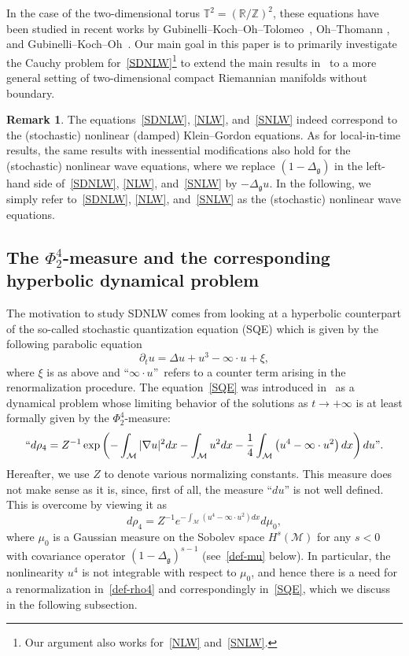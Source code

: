 \documentclass[10pt]{amsart}
\theoremstyle{definition}\newtheorem{defi}[theo]{Definition}\newtheorem{rema}[theo]{Remark}\newtheorem{exam}[theo]{Example}\newtheorem{exem}[theo]{Example}\newtheorem{nota}[theo]{Notation}
\newcommand{\Z}{\mathbb{Z}}
\newcommand{\R}{\mathbb{R}}
\newcommand{\T}{\mathbb{T}}
\newcommand{\M}{\mathcal{M}}
\newcommand{\g}{\mathfrak{g}}
\newcommand{\Dlg}{\Delta_{\g}}
\newcommand{\Dl}{\Delta}
\newcommand{\dt}{\partial_t}
\begin{document}
In the case of the two-dimensional torus $\T^2 = (\R/\Z)^2$, these equations have been studied in recent works by Gubinelli--Koch--Oh--Tolomeo~\cite{GKOT}, Oh--Thomann \cite{OT2}, and Gubinelli--Koch--Oh~\cite{GKO}. Our main goal in this paper is to primarily investigate the Cauchy problem for~\eqref{SDNLW}\footnote{Our argument also works for~\eqref{NLW} and~\eqref{SNLW}.} to extend the main results in~\cite{GKOT, OT2, GKO} to a more general setting of two-dimensional compact Riemannian manifolds without boundary.



\begin{rema}
The equations~\eqref{SDNLW}, \eqref{NLW}, and~\eqref{SNLW} indeed correspond to the (stochastic) nonlinear (damped) Klein--Gordon equations. As for local-in-time results, the same results with inessential modifications also hold for the (stochastic) nonlinear wave equations, where we replace $(1-\Dlg)$ in the left-hand side of~\eqref{SDNLW}, \eqref{NLW}, and~\eqref{SNLW} by $- \Dlg u$. In the following, we simply refer to~\eqref{SDNLW}, \eqref{NLW}, and~\eqref{SNLW} as the (stochastic) nonlinear wave equations.
\end{rema}


\subsection{The \texorpdfstring{$\Phi^4_2$}{Phi42}-measure and the corresponding hyperbolic dynamical problem}
The motivation to study SDNLW comes from looking at a hyperbolic counterpart of the so-called stochastic quantization equation (SQE) which is given by the following parabolic equation
\begin{equation}\label{SQE}
\dt u = \Dl u + u^3 - \infty\cdot u + \xi,
\end{equation}
where $\xi$ is as above and ``$\infty\cdot u$''~refers to a counter term arising in the renormalization procedure. The equation~\eqref{SQE} was introduced in~\cite{PW} as a dynamical problem whose limiting behavior of the solutions as $t\rightarrow +\infty$ is at least formally given by the $\Phi^4_2$-measure:
\begin{equation*}
``d\rho_4 = Z^{-1}\exp\left(-\int_{\M}|\nabla u|^2 dx -\int_{\M}u^2 dx -\frac{1}{4}\int_{\M}\left(u^4-\infty\cdot u^2\right) dx\right)du".
\end{equation*}
Hereafter, we use $Z$ to denote various normalizing constants. This measure does not make sense as it is, since, first of all, the measure ``$du$'' is not well defined. This is overcome by viewing it as
\begin{equation}\label{def-rho4}
d\rho_4 = Z^{-1}e^{-\int_{\M}\left(u^4-\infty\cdot u^2\right) dx}d\mu_0,
\end{equation}
where $\mu_0$ is a Gaussian measure on the Sobolev space $H^s(\M)$ for any $s<0$ with covariance operator $(1-\Dlg)^{s-1}$ (see~\eqref{def-mu} below). In particular, the nonlinearity $u^4$ is not integrable with respect to $\mu_0$, and hence there is a need for a renormalization in~\eqref{def-rho4} and correspondingly in~\eqref{SQE}, which we discuss in the following subsection.
\end{document}
